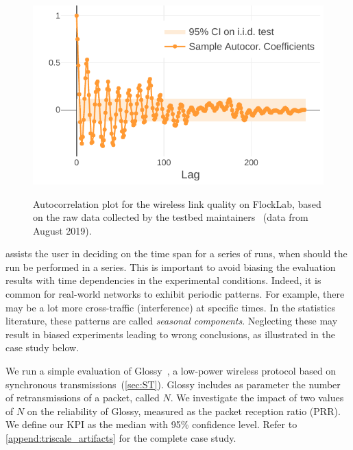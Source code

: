\begin{figure}
    \centering
   	\href{\triscalefig{Figure-4}}{
    \includegraphics[scale=1]{Figures/plot_flocklab_autocorr.pdf}}

    \caption{Autocorrelation plot for the wireless link quality on FlockLab, based on the raw data collected by the testbed maintainers~\cite{jacob2019datasetLQE} (data from August 2019).
    }
    \label{fig:flocklab_autocorr}
\end{figure}

\triscale assists the user in deciding on the time span for a series of runs, \ie when should the run be performed in a series. This is important to avoid biasing the evaluation results with time dependencies in the experimental conditions.
Indeed, it is common for real-world networks to exhibit periodic patterns.
For example, there may be a lot more cross-traffic (\ie interference) at specific times. In the statistics literature, these patterns are called \emph{seasonal components}.
Neglecting these may result in biased experiments leading to wrong conclusions, as illustrated in the case study below.

We run a simple evaluation of Glossy~\cite{ferrari2011Glossy}, a low-power wireless protocol based on synchronous transmissions~(\cref{sec:ST}). Glossy includes as parameter the number of retransmissions of a packet, called $N$. We investigate the impact of two values of $N$ on the reliability of Glossy, measured as the packet reception ratio (PRR). We define our KPI as the median with 95\% confidence level.
Refer to \cref{append:triscale_artifacts} for the complete case study.

